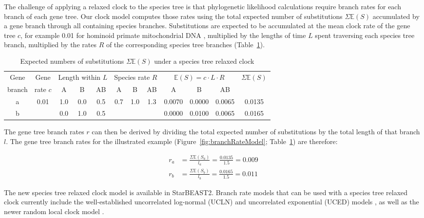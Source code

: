 \documentclass[nogrid]{MBE}%
\begin{document}
The challenge of applying a relaxed clock to the species tree is that
phylogenetic likelihood calculations require branch rates for each branch of
each gene tree. Our clock model computes those rates using the total expected number of substitutions
$\Sigma \mathbb{E}(S)$ accumulated by a gene branch through all containing
species branches. Substitutions are expected to be accumulated at the mean
clock rate of the gene tree $c$, for example 0.01 for hominoid primate
mitochondrial DNA \citep{doi:10.1146/annurev.es.18.110187.001413}, multiplied
by the lengths of time $L$ spent traversing each species tree branch, multiplied
by the rates $R$ of the corresponding species tree branches
(Table~\ref{tab:branchRateModel}).

\begin{table}[htb!]
\caption{Expected numbers of substitutions $\Sigma \mathbb{E}(S)$ under a species tree relaxed clock}
\label{tab:branchRateModel}
\begin{threeparttable}
\begin{tabular*}{\textwidth}{@{\extracolsep{\fill}}cccccccccccc@{}}
\hline
Gene & Gene & \multicolumn{3}{c}{Length within $L$} & \multicolumn{3}{c}{Species rate $R$} & \multicolumn{3}{c}{$\mathbb{E}(S) = c\cdot L\cdot R$} & \multirow{2}{*}{$\Sigma \mathbb{E}(S)$}\tabularnewline
branch & rate $c$ & A & B & AB & A & B & AB & A & B & AB & \tabularnewline
\hline
a & \multirow{2}{*}{0.01} & 1.0 & 0.0 & 0.5 & \multirow{2}{*}{0.7} & \multirow{2}{*}{1.0} & \multirow{2}{*}{1.3} & 0.0070 & 0.0000 & 0.0065 & 0.0135\tabularnewline
b & & 0.0 & 1.0 & 0.5 & & & & 0.0000 & 0.0100 & 0.0065 & 0.0165\tabularnewline
\hline
\end{tabular*}
\end{threeparttable}
\end{table}

The gene tree branch rates $r$ can then be derived by dividing the total
expected number of substitutions by the total length of that branch $l$. The
gene tree branch rates for the illustrated example
(Figure~\ref{fig:branchRateModel}; Table~\ref{tab:branchRateModel}) are
therefore:

\begin{align}
r_a &= \frac{\Sigma \mathbb{E}(S_a)}{l_a} = \frac{0.0135}{1.5} = 0.009\\
r_b &= \frac{\Sigma \mathbb{E}(S_b)}{l_b} = \frac{0.0165}{1.5} = 0.011
\end{align}

The new species tree relaxed clock model is available in StarBEAST2. Branch rate
models that can be used with a species tree relaxed clock currently include the
well-established uncorrelated log-normal (UCLN) and uncorrelated exponential
(UCED) models \citep{10.1371/journal.pbio.0040088}, as well as the newer random
local clock model \citep{Drummond2010}.
\end{document}
